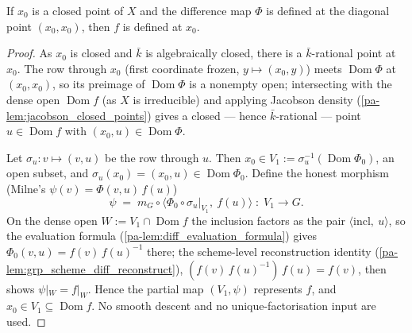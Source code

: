 \begin{theorem}
  \label{pa-thm:row_section}
  \leanok

  If \(x_0\) is a closed point of \(X\) and the difference map \(\Phi\) is defined
  at the diagonal point \((x_0, x_0)\), then \(f\) is defined at \(x_0\).
\end{theorem}
\begin{proof}
  \leanok
  As \(x_0\) is closed and \(\bar k\) is algebraically closed, there is a
  \(\bar k\)-rational point at \(x_0\). The row through \(x_0\) (first coordinate
  frozen, \(y \mapsto (x_0, y)\)) meets \(\operatorname{Dom}\Phi\) at
  \((x_0, x_0)\), so its preimage of \(\operatorname{Dom}\Phi\) is a nonempty
  open; intersecting with the dense open \(\operatorname{Dom} f\) (as \(X\) is
  irreducible) and applying Jacobson density (\ref{pa-lem:jacobson_closed_points})
  gives a closed --- hence \(\bar k\)-rational --- point \(u \in
  \operatorname{Dom} f\) with \((x_0, u) \in \operatorname{Dom}\Phi\).

  Let \(\sigma_u : v \mapsto (v, u)\) be the row through \(u\). Then \(x_0 \in
  V_1 := \sigma_u^{-1}(\operatorname{Dom}\Phi_0)\), an open subset, and
  \(\sigma_u(x_0) = (x_0, u) \in \operatorname{Dom}\Phi_0\). Define the honest
  morphism (Milne's \(\psi(v) = \Phi(v, u)\,f(u)\))
  \[
    \psi \;=\; m_G \circ \bigl\langle \Phi_0 \circ \sigma_u|_{V_1},\ f(u)\bigr\rangle
    \;:\; V_1 \longrightarrow G .
  \]
  On the dense open \(W := V_1 \cap \operatorname{Dom} f\) the inclusion factors
  as the pair \(\langle \text{incl},\ u\rangle\), so the evaluation formula
  (\ref{pa-lem:diff_evaluation_formula}) gives \(\Phi_0(v, u) = f(v)\,f(u)^{-1}\)
  there; the scheme-level reconstruction identity
  (\ref{pa-lem:grp_scheme_diff_reconstruct}), \((f(v)\,f(u)^{-1})\,f(u) = f(v)\),
  then shows \(\psi|_W = f|_W\). Hence the partial map \((V_1, \psi)\) represents
  \(f\), and \(x_0 \in V_1 \subseteq \operatorname{Dom} f\). No smooth descent and
  no unique-factorisation input are used.
\end{proof}

